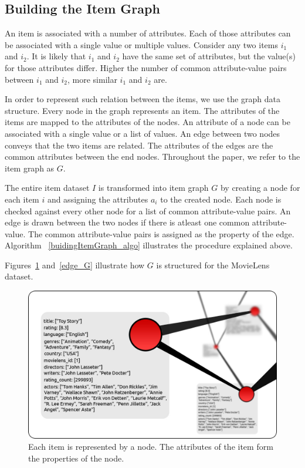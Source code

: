 \documentclass{acm_proc_article-sp}
\begin{document}
\subsection{Building the Item Graph}
\label{sec:buidingItemGraph}
An item is associated with a number of attributes. Each of those attributes can be associated with a single value or multiple values. Consider any two items $i_1$ and $i_2$. It is likely that $i_1$ and $i_2$ have the same set of attributes, but the value(s) for those attributes differ. Higher the number of common attribute-value pairs between $i_1$ and $i_2$, more similar $i_1$ and $i_2$ are.

In order to represent such relation between the items, we use the graph data structure. Every node in the graph represents an item. The attributes of the items are mapped to the attributes of the nodes. An attribute of a node can be associated with a single value or a list of values. An edge between two nodes conveys that the two items are related. The attributes of the edges are the common attributes between the end nodes. Throughout the paper, we refer to the item graph as $G$. 

The entire item dataset $I$ is transformed into item graph $G$ by creating a node for each item $i$ and assigning the attributes $a_i$ to the created node. Each node is checked against every other node for a list of common attribute-value pairs. An edge is drawn between the two nodes if there is atleast one common attribute-value. The common attribute-value pairs is assigned as the property of the edge. Algorithm ~\ref{buidingItemGraph_algo} illustrates the procedure explained above.

Figures~\ref{node_G} and~\ref{edge_G} illustrate how $G$ is structured for the MovieLens dataset.

\begin{figure}[htp]
\centering
\includegraphics[scale=0.2]{Results/nodes.png}
\caption{Each item is represented by a node. The attributes of the item form the properties of the node.}
\label{node_G}
\end{figure}
\end{document}
